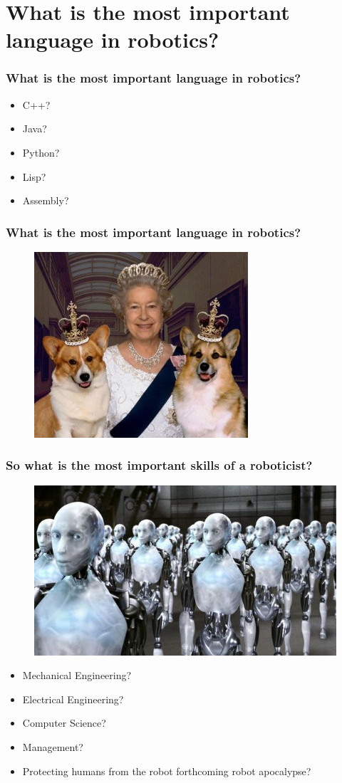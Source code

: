 \documentclass[compress]{beamer}
\begin{document}
\section{What is the most important language in robotics?}
\begin{frame}
  \frametitle{What is the most important language in robotics?}
  \begin{itemize}
  \item C++?
  \item Java?
  \item Python?
  \item Lisp?
  \item Assembly?
  \end{itemize}
\end{frame}
\begin{frame}
   \frametitle{What is the most important language in robotics?}
   \begin{figure}
     \includegraphics[width=0.5\linewidth]{corgis.jpg}
   \end{figure}
 \end{frame}
\begin{frame}
  \frametitle{So what is the most important skills of a roboticist?}
  \begin{figure}
     \includegraphics[width=0.5\linewidth]{robot-army.jpg}
   \end{figure}
   \begin{itemize}
   \item Mechanical Engineering?
   \item Electrical Engineering?
   \item Computer Science?
   \item Management?
   \item Protecting humans from the robot forthcoming robot apocalypse?
   \end{itemize}
 \end{frame}
\end{document}
